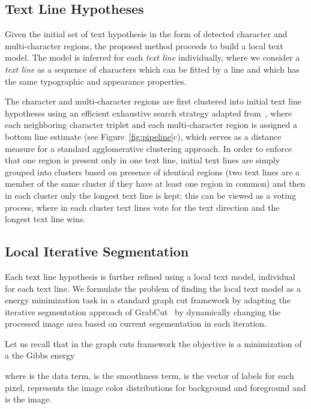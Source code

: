 \documentclass[conference]{IEEEtran}
\begin{document}
\vspace{-5pt}
\subsection{Text Line Hypotheses}
\label{sec:textLineHypotheses}



Given the initial set of text hypothesis in the form of detected character and multi-character regions, the proposed method proceeds to build a local text model. The model is inferred for each \emph{text line} individually, where we consider a \emph{text line} as a sequence of characters which can be fitted by a line and which has the same typographic and appearance properties.

The character and multi-character regions are first clustered into initial text line hypotheses using an efficient exhaustive search strategy adapted from~\cite{Neumann-ICDAR11}, where each neighboring character triplet and each multi-character region is assigned a bottom line estimate (see Figure~\ref{fig:pipeline}c), which serves as a distance measure for a standard agglomerative clustering approach. In order to enforce that one region is present only in one text line, initial text lines are simply grouped into clusters based on presence of identical regions (two text lines are a member of the same cluster if they have at least one region in common) and then in each cluster only the longest text line is kept; this can be viewed as a voting process, where in each cluster text lines vote for the text direction and the longest text line wins.


\subsection{Local Iterative Segmentation}
\label{sec:localTextModel}

Each text line hypothesis is further refined using a local text model, individual for each text line. We formulate the problem of finding the local text model as a energy minimization task in a standard graph cut framework by adapting the iterative segmentation approach of GrabCut~\cite{rother2004grabcut} by dynamically changing the processed image area based on current segementation in each iteration.

Let us recall that in the graph cuts framework the objective is a minimization of a the Gibbs energy

where  is the data term,  is the smoothness term,  is the vector of labels for each pixel,  represents the image color distributions for background and foreground and  is the image.
\end{document}
